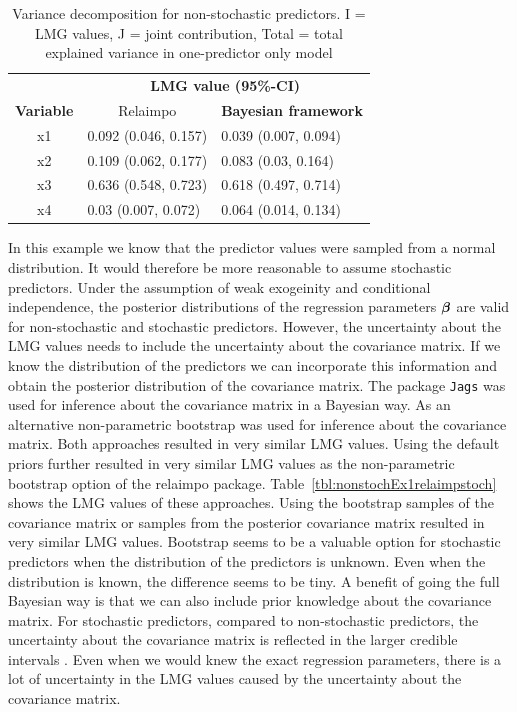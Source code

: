 \documentclass[11pt,a4paper,twoside]{book}\usepackage[]{graphicx}\usepackage[]{color}
\begin{document}
\begin{table}[h]
\caption{Variance decomposition for non-stochastic predictors. I = LMG values, J = joint contribution, Total = total explained variance in one-predictor only model}
\centering
\begin{tabular}{cll}
   \toprule
   &\multicolumn{2}{c}{\textbf{LMG value (95\%-CI)}} \\
 \textbf{Variable} & \multicolumn{1}{c}{Relaimpo} & \textbf{Bayesian framework}  \\
  \hline
x1 & 0.092 (0.046, 0.157)  & 0.039 (0.007, 0.094)  \\ 
x2 & 0.109 (0.062, 0.177)  & 0.083 (0.03, 0.164)   \\ 
x3 & 0.636 (0.548, 0.723)  & 0.618 (0.497, 0.714)  \\ 
x4 & 0.03 (0.007, 0.072) & 0.064 (0.014, 0.134)  \\ 
   \bottomrule
\end{tabular}
\label{tbl:nonstochEx1relamip}
\end{table}

\FloatBarrier


In this example we know that the predictor values were sampled from a normal distribution. It would therefore be more reasonable to assume stochastic predictors. Under the assumption of weak exogeinity and conditional independence, the posterior distributions of the regression parameters ${\boldsymbol{\beta}}$ are valid for non-stochastic and stochastic predictors. However, the uncertainty about the LMG values needs to include the uncertainty about the covariance matrix. If we know the distribution of the predictors we can incorporate this information and obtain the posterior distribution of the covariance matrix. The package \texttt{Jags} was used for inference about the covariance matrix in a Bayesian way. As an alternative non-parametric bootstrap was used for inference about the covariance matrix. Both approaches resulted in very similar LMG values. Using the default priors further resulted in very similar LMG values as the non-parametric bootstrap option of the relaimpo package. Table~\ref{tbl:nonstochEx1relaimpstoch} shows the LMG values of these approaches. Using the bootstrap samples of the covariance matrix or samples from the posterior covariance matrix resulted in very similar LMG values. Bootstrap seems to be a valuable option for stochastic predictors when the distribution of the predictors is unknown. Even when the distribution is known, the difference seems to be tiny. A benefit of going the full Bayesian way is that we can also include prior knowledge about the covariance matrix. For stochastic predictors, compared to non-stochastic predictors, the uncertainty about the covariance matrix is reflected in the larger credible intervals . Even when we would knew the exact regression parameters, there is a lot of uncertainty in the LMG values caused by the uncertainty about the covariance matrix. 
\end{document}
